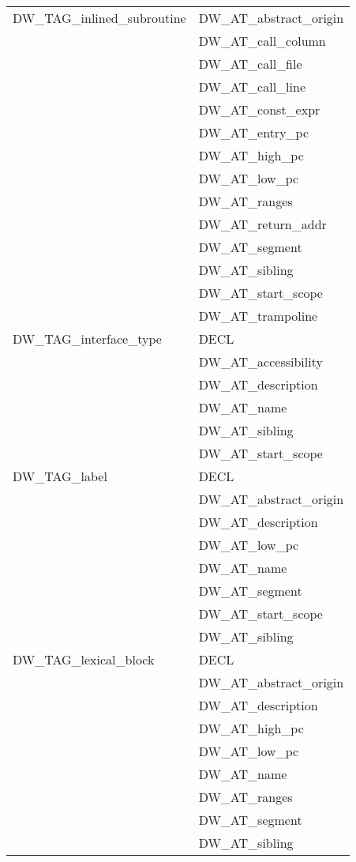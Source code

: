 \begin{longtable}{l|p{8cm}}
DW\_TAG\_inlined\_subroutine
&DW\_AT\_abstract\_origin \\
&DW\_AT\_call\_column \\
&DW\_AT\_call\_file \\
&DW\_AT\_call\_line \\
&DW\_AT\_const\_expr \\
&DW\_AT\_entry\_pc \\
&DW\_AT\_high\_pc \\
&DW\_AT\_low\_pc \\
&DW\_AT\_ranges \\
&DW\_AT\_return\_addr \\
&DW\_AT\_segment \\
&DW\_AT\_sibling \\
&DW\_AT\_start\_scope \\
&DW\_AT\_trampoline \\

DW\_TAG\_interface\_type
&DECL \\
&DW\_AT\_accessibility \\
&DW\_AT\_description \\
&DW\_AT\_name \\
&DW\_AT\_sibling \\
&DW\_AT\_start\_scope \\

DW\_TAG\_label
&DECL \\
&DW\_AT\_abstract\_origin \\
&DW\_AT\_description \\
&DW\_AT\_low\_pc \\
&DW\_AT\_name \\
&DW\_AT\_segment \\
&DW\_AT\_start\_scope \\
&DW\_AT\_sibling \\

DW\_TAG\_lexical\_block
&DECL \\
&DW\_AT\_abstract\_origin \\
&DW\_AT\_description \\
&DW\_AT\_high\_pc \\
&DW\_AT\_low\_pc \\
&DW\_AT\_name \\
&DW\_AT\_ranges \\
&DW\_AT\_segment \\
&DW\_AT\_sibling \\


\end{longtable}
